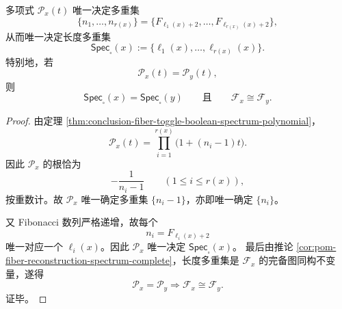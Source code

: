 \begin{theorem}[扇区维数多项式对纤维谱的完全反演]\label{thm:conclusion-fiber-toggle-sector-polynomial-complete-reconstruction}
多项式 \(\mathscr P_x(t)\) 唯一决定多重集
\[
\{n_1,\dots,n_{r(x)}\}
=
\{F_{\ell_1(x)+2},\dots,F_{\ell_{r(x)}(x)+2}\},
\]
从而唯一决定长度多重集
\[
\mathsf{Spec}_{\square}(x):=\{\ell_1(x),\dots,\ell_{r(x)}(x)\}.
\]
特别地，若
\[
\mathscr P_x(t)=\mathscr P_y(t),
\]
则
\[
\mathsf{Spec}_{\square}(x)=\mathsf{Spec}_{\square}(y)
\qquad\text{且}\qquad
\mathcal F_x\cong \mathcal F_y.
\]
\end{theorem}
\begin{proof}
由定理 \ref{thm:conclusion-fiber-toggle-boolean-spectrum-polynomial}，
\[
\mathscr P_x(t)=\prod_{i=1}^{r(x)}\bigl(1+(n_i-1)t\bigr).
\]
因此 \(\mathscr P_x\) 的根恰为
\[
-\frac{1}{n_i-1}
\qquad (1\le i\le r(x)),
\]
按重数计。故 \(\mathscr P_x\) 唯一确定多重集 \(\{n_i-1\}\)，亦即唯一确定 \(\{n_i\}\)。

又 Fibonacci 数列严格递增，故每个
\[
n_i=F_{\ell_i(x)+2}
\]
唯一对应一个 \(\ell_i(x)\)。因此 \(\mathscr P_x\) 唯一决定 \(\mathsf{Spec}_{\square}(x)\)。
最后由推论 \ref{cor:pom-fiber-reconstruction-spectrum-complete}，长度多重集是 \(\mathcal F_x\) 的完备图同构不变量，遂得
\[
\mathscr P_x=\mathscr P_y
\Longrightarrow
\mathcal F_x\cong \mathcal F_y.
\]
证毕。
\end{proof}

